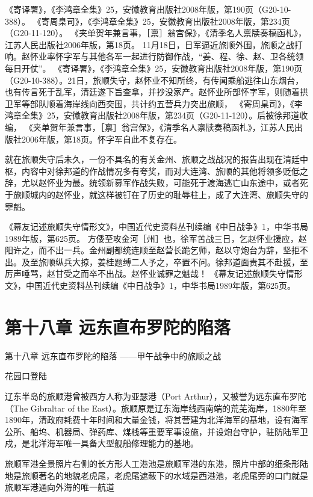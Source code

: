 \documentclass[12pt,UTF8]{ctexbook}
\begin{document}
《寄译署》，《李鸿章全集》25，安徽教育出版社2008年版，第190页（G20-10-388）。
《寄周臬司》，《李鸿章全集》25，安徽教育出版社2008年版，第234页（G20-11-120）。
《夹单贺年兼言事，［禀］翁宫保》，《清季名人禀牍奏稿函札》，江苏人民出版社2006年版，第18页。
11月18日，日军逼近旅顺外围，旅顺之战打响。赵怀业率怀字军与其他各军一起进行防御作战，“姜、程、徐、赵、卫各统领每日开仗”。 《寄译署》，《李鸿章全集》25，安徽教育出版社2008年版，第190页（G20-10-388）。21日，旅顺失守，赵怀业不知所终，有传闻乘船逃往山东烟台，也有传言死于乱军，清廷遂下旨查拿，并抄没家产。赵怀业所部怀字军，则随着拱卫军等部队顺着海岸线向西突围，共计约五营兵力突出旅顺， 《寄周臬司》，《李鸿章全集》25，安徽教育出版社2008年版，第234页（G20-11-120）。后被徐邦道收编， 《夹单贺年兼言事，［禀］翁宫保》，《清季名人禀牍奏稿函札》，江苏人民出版社2006年版，第18页。怀字军自此不复存在。

就在旅顺失守后未久，一份不具名的有关金州、旅顺之战战况的报告出现在清廷中枢，内容中对徐邦道的作战情况多有夸奖，而对大连湾、旅顺的其他将领多贬低之辞，尤以赵怀业为最。统领新募军作战失败，可能死于渡海逃亡山东途中，或者死于旅顺城内的赵怀业，就这样被钉在了历史的耻辱柱上，成了大连湾、旅顺失守的罪魁。

《幕友记述旅顺失守情形文》，中国近代史资料丛刊续编《中日战争》1，中华书局1989年版，第625页。
方倭至攻金河［州］也，徐军苦战三日，乞赵怀业援应，赵阳许之，而不出一兵。金州副都统连顺至赵营长跪乞师，赵以守炮台为辞，坚拒不出。及至旅顺纵兵大掠，姜桂题缚二人予之，卒置不问。徐邦道面责其不赴援，至厉声唾骂，赵甘受之而卒不出战。赵怀业诚罪之魁哉！ 《幕友记述旅顺失守情形文》，中国近代史资料丛刊续编《中日战争》1，中华书局1989年版，第625页。

\chapter{第十八章 远东直布罗陀的陷落}

第十八章
远东直布罗陀的陷落
——甲午战争中的旅顺之战

花园口登陆

辽东半岛的旅顺港曾被西方人称为亚瑟港（Port Arthur），又被誉为远东直布罗陀（The Gibraltar of the East）。旅顺原是辽东海岸线西南端的荒芜海岸，1880年至1890年，清政府耗费十年时间和大量金钱，将其营建为北洋海军的基地，设有海军公所、船坞、机器局、弹药库、煤栈等重要军事设施，并设炮台守护，驻防陆军卫戍，是北洋海军唯一具备大型舰船修理能力的基地。


旅顺军港全景照片右侧的长方形人工港池是旅顺军港的东港，照片中部的细条形陆地是旅顺著名的地貌老虎尾，老虎尾遮蔽下的水域是西港池，老虎尾旁的口门就是旅顺军港通向外海的唯一航道
\end{document}
